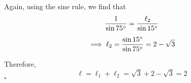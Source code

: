 \documentclass[a4paper]{article}
\begin{document}
Again, using the sine rule, we find that
\begin{gather*}
\frac{1}{\sin 75\degree} = \frac{\ell_2}{\sin 15\degree}\\[0.5em]
\implies \ell_2 = \frac{\sin 15\degree}{\sin 75\degree} = 2 - \sqrt{3}
\end{gather*}

Therefore, $$\ell = \ell_1 + \ell_2 = \sqrt{3} + 2 - \sqrt{3} = 2$$
\hspace{\fill}$\square$
\end{document}
